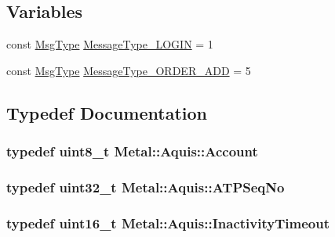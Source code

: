 \subsection*{Variables}
\begin{DoxyCompactItemize}
\item 
const \hyperlink{namespaceMetal_1_1Aquis_ac6c095b7eefa1d7918de0fe9387f3786}{Msg\+Type} \hyperlink{namespaceMetal_1_1Aquis_a103f484918d9c4a9f8531afdc07c99a7}{Message\+Type\+\_\+\+L\+O\+G\+I\+N} = 1
\item 
const \hyperlink{namespaceMetal_1_1Aquis_ac6c095b7eefa1d7918de0fe9387f3786}{Msg\+Type} \hyperlink{namespaceMetal_1_1Aquis_aa5562d10850d07aa417f1ae32efc84e2}{Message\+Type\+\_\+\+O\+R\+D\+E\+R\+\_\+\+A\+D\+D} = 5
\end{DoxyCompactItemize}


\subsection{Typedef Documentation}
\hypertarget{namespaceMetal_1_1Aquis_acbe82ae737d4c087f18f1af8aabd1d26}{}
\subsubsection[{Account}]{\setlength{\rightskip}{0pt plus 5cm}typedef uint8\+\_\+t {\bf Metal\+::\+Aquis\+::\+Account}}\label{namespaceMetal_1_1Aquis_acbe82ae737d4c087f18f1af8aabd1d26}
\hypertarget{namespaceMetal_1_1Aquis_a1cd395dbf71a74cc9a7565053bf63a7f}{}
\subsubsection[{A\+T\+P\+Seq\+No}]{\setlength{\rightskip}{0pt plus 5cm}typedef uint32\+\_\+t {\bf Metal\+::\+Aquis\+::\+A\+T\+P\+Seq\+No}}\label{namespaceMetal_1_1Aquis_a1cd395dbf71a74cc9a7565053bf63a7f}
\hypertarget{namespaceMetal_1_1Aquis_aa9b1c4c30c2f68cc03b4fe9ca2a7cd14}{}
\subsubsection[{Inactivity\+Timeout}]{\setlength{\rightskip}{0pt plus 5cm}typedef uint16\+\_\+t {\bf Metal\+::\+Aquis\+::\+Inactivity\+Timeout}}\label{namespaceMetal_1_1Aquis_aa9b1c4c30c2f68cc03b4fe9ca2a7cd14}
\hypertarget{namespaceMetal_1_1Aquis_ac6c095b7eefa1d7918de0fe9387f3786}{}

